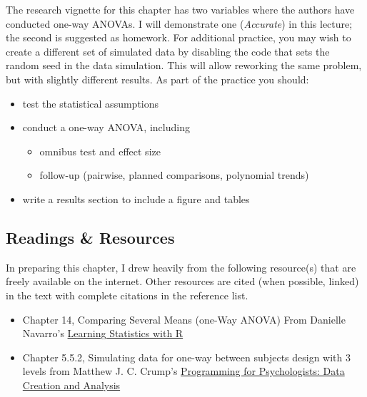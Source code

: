 \documentclass[
  english,
]{book}
\providecommand{\tightlist}{%
  \setlength{\itemsep}{0pt}\setlength{\parskip}{0pt}}
\begin{document}
The research vignette for this chapter \citep{tran_you_2014} has two variables where the authors have conducted one-way ANOVAs. I will demonstrate one (\emph{Accurate}) in this lecture; the second is suggested as homework. For additional practice, you may wish to create a different set of simulated data by disabling the code that sets the random seed in the data simulation. This will allow reworking the same problem, but with slightly different results. As part of the practice you should:

\begin{itemize}
\tightlist
\item
  test the statistical assumptions
\item
  conduct a one-way ANOVA, including

  \begin{itemize}
  \tightlist
  \item
    omnibus test and effect size
  \item
    follow-up (pairwise, planned comparisons, polynomial trends)
  \end{itemize}
\item
  write a results section to include a figure and tables
\end{itemize}

\hypertarget{readings-resources-1}{%
\subsection{Readings \& Resources}\label{readings-resources-1}}

In preparing this chapter, I drew heavily from the following resource(s) that are freely available on the internet. Other resources are cited (when possible, linked) in the text with complete citations in the reference list.

\begin{itemize}
\tightlist
\item
  Chapter 14, Comparing Several Means (one-Way ANOVA) From Danielle Navarro's \href{https://learningstatisticswithr.com/}{Learning Statistics with R}
\item
  Chapter 5.5.2, Simulating data for one-way between subjects design with 3 levels from Matthew J. C. Crump's \href{https://crumplab.github.io/programmingforpsych/simulating-and-analyzing-data-in-r.html\#single-factor-anovas-data-simulation-and-analysis}{Programming for Psychologists: Data Creation and Analysis}
\end{itemize}
\end{document}
